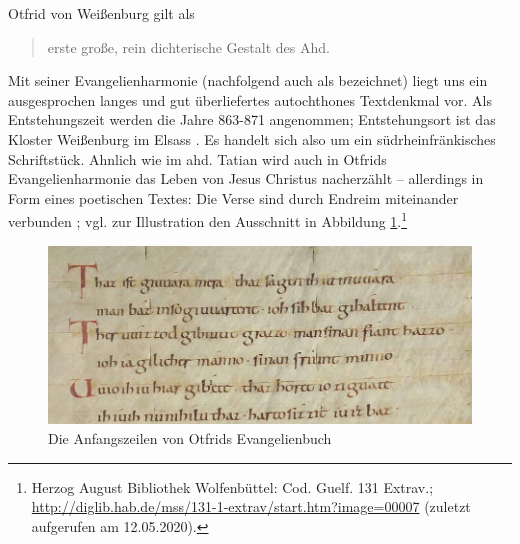 Otfrid von Weißenburg gilt als \blockcquote[146]{Sonderegger2003}{erste große, rein dichterische Gestalt des Ahd.}. Mit seiner Evangelienharmonie (nachfolgend auch als  bezeichnet) liegt uns ein ausgesprochen langes und gut überliefertes autochthones Textdenkmal vor. Als Entstehungszeit werden die Jahre 863-871 angenommen; Entstehungsort ist das Kloster Weißenburg im Elsass \parencite[50]{Fleischer2011}. Es handelt sich also um ein südrheinfränkisches Schriftstück. Ahnlich wie im ahd. Tatian wird auch in Otfrids Evangelienharmonie das Leben von Jesus Christus nacherzählt -- allerdings in Form eines poetischen Textes: Die Verse sind durch Endreim miteinander verbunden   \parencite[zu Variationen im Versmaß s. ausführlich][148-150] {Sonderegger2003}; vgl. zur Illustration den Ausschnitt in Abbildung \ref{abb:otfrid-hand}.\footnote{Herzog August Bibliothek Wolfenbüttel: Cod. Guelf. 131 Extrav.; \url{http://diglib.hab.de/mss/131-1-extrav/start.htm?image=00007} (zuletzt aufgerufen am 12.05.2020).}


\begin{figure}[h]
\begin{center}
  \includegraphics[width=10 cm]{images/otfrid-handschrift-ausschnitt.jpg}
  \caption {Die Anfangszeilen von Otfrids Evangelienbuch}
\label{abb:otfrid-hand}
\end{center}
\end{figure} 



